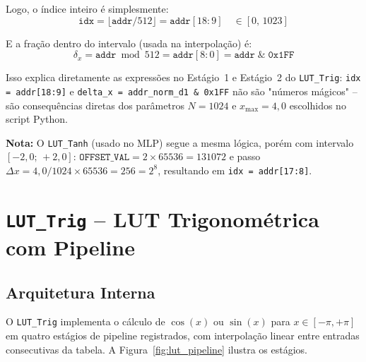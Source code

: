 \documentclass[a4paper,12pt]{article}
\begin{document}
Logo, o \'indice inteiro \'e simplesmente:
\[
    \texttt{idx} = \lfloor \texttt{addr} / 512 \rfloor
               = \texttt{addr}[18\!:\!9]
               \quad\in [0,\,1023]
\]

E a fra\c{c}\~ao dentro do intervalo (usada na interpola\c{c}\~ao) \'e:
\[
    \delta_x = \texttt{addr} \bmod 512
             = \texttt{addr}[8\!:\!0]
             = \texttt{addr} \;\&\; \texttt{0x1FF}
\]

Isso explica diretamente as express\~oes no Est\'agio~1 e Est\'agio~2 do \texttt{LUT\_Trig}:
\texttt{idx = addr[18:9]} e \texttt{delta\_x = addr\_norm\_d1 \& 0x1FF} n\~ao s\~ao
"n\'umeros m\'agicos" -- s\~ao consequ\^encias diretas dos par\^ametros $N = 1024$ e
$x_{\max} = 4{,}0$ escolhidos no script Python.

\medskip
\noindent\textbf{Nota:} O \texttt{LUT\_Tanh} (usado no MLP) segue a mesma l\'ogica, por\'em
com intervalo $[-2{,}0;\,+2{,}0]$: $\texttt{OFFSET\_VAL} = 2 \times 65536 = 131072$ e
passo $\Delta x = 4{,}0/1024 \times 65536 = 256 = 2^{8}$, resultando em
\texttt{idx = addr[17:8]}.

\section{\texttt{LUT\_Trig} -- LUT Trigonom\'etrica com Pipeline}

\subsection{Arquitetura Interna}

O \texttt{LUT\_Trig} implementa o c\'alculo de $\cos(x)$ ou $\sin(x)$ para $x \in [-\pi, +\pi]$
em quatro est\'agios de pipeline registrados, com interpola\c{c}\~ao linear entre entradas
consecutivas da tabela. A Figura~\ref{fig:lut_pipeline} ilustra os est\'agios.
\end{document}
